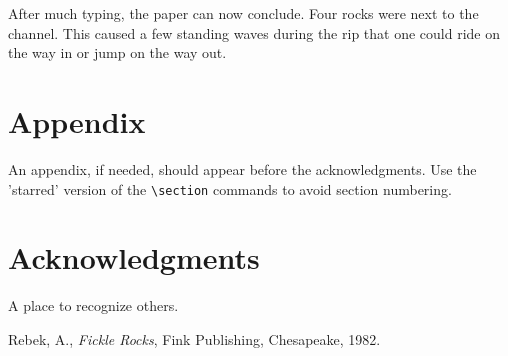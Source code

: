 \documentclass[]{aiaa-tc}%
\begin{document}
After much typing, the paper can now conclude.
Four rocks were next to the channel.
This caused a few standing waves during the rip that one could ride on
the way in or jump on the way out.

\section*{Appendix}

An appendix, if needed, should appear before the acknowledgments.
Use the 'starred' version of the \verb|\section| commands to avoid
section numbering.

\section*{Acknowledgments}

A place to recognize others.

\begin{thebibliography}{9}%
 Rebek, A., {\it Fickle Rocks}, Fink Publishing, Chesapeake, 1982.
\end{thebibliography}



\end{document}
